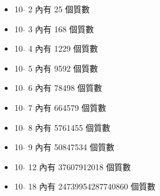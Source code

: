 \begin{itemize}
  \item 10  $\hat{}$ 2  內有 25 個質數
  \item 10  $\hat{}$ 3  內有 168 個質數
  \item 10  $\hat{}$ 4  內有 1229 個質數
  \item 10  $\hat{}$ 5  內有 9592 個質數
  \item 10  $\hat{}$ 6  內有 78498 個質數
  \item 10  $\hat{}$ 7  內有 664579 個質數
  \item 10  $\hat{}$ 8  內有 5761455 個質數
  \item 10  $\hat{}$ 9  內有 50847534 個質數
  \item 10  $\hat{}$ 12  內有 37607912018 個質數
  \item 10  $\hat{}$ 18  內有 24739954287740860 個質數
\end{itemize}